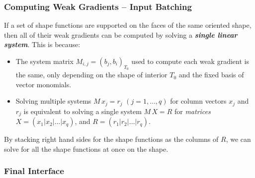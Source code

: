 \documentclass[compress]{beamer}
\begin{document}
\begin{frame}
  \frametitle{Computing Weak Gradients -- Input Batching}
  If a set of shape functions are supported on the faces of the same oriented shape, then all of their weak gradients
  can be computed by solving a \emph{\textbf{single linear system}}. This is because:
  \pause
  \begin{itemize}[<+->]
    \item The system matrix $M_{i,j} = (b_j, b_i)_{T_0}$ used to compute each weak gradient is the same, only depending
      on the shape of interior $T_0$ and the fixed basis of vector monomials.
    \item Solving multiple systems $M\,x_j = r_j$ {\scriptsize $(j=1,\dots,q)$} for column vectors $x_j$ and $r_j$
      is equivalent to solving a single system $M\,X = R$ for \emph{matrices}
      $X = (x_1|x_2|\dots|x_q)$, and $R = (r_1|r_2|\dots|r_q)$.
  \end{itemize}
  \uncover<+-> {
    \uncover<+-> {
      By stacking right hand sides for the shape functions as the columns of $R$, we can solve for all the shape functions at once on 
      the shape.
    }
  }
\end{frame}

\subsubsection{Final Interface}
\end{document}
